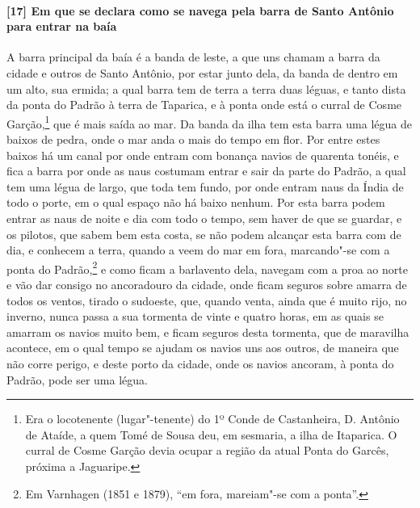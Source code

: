 \paragraph{[17] Em que se declara como se navega pela barra de Santo Antônio para entrar na
baía} \quad
A barra principal da baía é a banda de leste, a que uns chamam a barra da cidade e
outros de Santo Antônio, por estar junto dela, da banda de dentro em um alto, sua ermida;
a qual barra tem de terra a terra duas léguas, e tanto dista da ponta do Padrão à terra de
Taparica, e à ponta onde está o curral de Cosme Garção,\footnote{ Era o locotenente
(lugar"-tenente) do 1º Conde de Castanheira, D. Antônio de Ataíde, a quem Tomé de Sousa
deu, em sesmaria, a ilha de Itaparica. O curral de Cosme Garção devia ocupar a região da
atual Ponta do Garcês, próxima a Jaguaripe.} que é mais saída ao mar. Da banda da ilha tem
esta barra uma légua de baixos de pedra, onde o mar anda o mais do tempo em flor. Por
entre estes baixos há um canal por onde entram com bonança navios de quarenta tonéis, e
fica a barra por onde as naus costumam entrar e sair da parte do Padrão, a qual tem uma
légua de largo, que toda tem fundo, por onde entram naus da Índia de todo o porte, em o
qual espaço não há baixo nenhum. Por esta barra podem entrar as naus de noite e dia com
todo o tempo, sem haver de que se guardar, e os pilotos, que sabem bem esta costa, se não
podem alcançar esta barra com de dia, e conhecem a terra, quando a veem do mar em fora,
marcando"-se com a ponta do Padrão,\footnote{ Em Varnhagen (1851 e 1879), ``em fora,
mareiam"-se com a ponta''.} e como ficam a barlavento dela, navegam com a proa ao norte e
vão dar consigo no ancoradouro da cidade, onde ficam seguros sobre amarra de todos os
ventos, tirado o sudoeste, que, quando venta, ainda que é muito rijo, no inverno,
nunca passa a sua tormenta de vinte e quatro horas, em as quais se
amarram os navios muito bem, e ficam seguros desta tormenta, que de maravilha acontece, em
o qual tempo se ajudam os navios uns aos outros, de maneira que não corre perigo, e deste
porto da cidade, onde os navios ancoram, à ponta do Padrão, pode ser uma légua.

